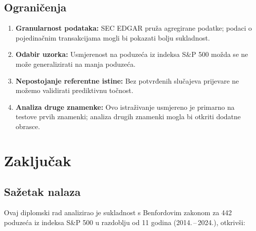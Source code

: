 \documentclass[12pt,a4paper]{article}
\begin{document}
\subsection{Ograničenja}

\begin{enumerate}
    \item \textbf{Granularnost podataka:} SEC EDGAR pruža agregirane podatke; podaci o pojedinačnim transakcijama mogli bi pokazati bolju sukladnost.

    \item \textbf{Odabir uzorka:} Usmjerenost na poduzeća iz indeksa S\&P 500 možda se ne može generalizirati na manja poduzeća.

    \item \textbf{Nepostojanje referentne istine:} Bez potvrđenih slučajeva prijevare ne možemo validirati prediktivnu točnost.

    \item \textbf{Analiza druge znamenke:} Ovo istraživanje usmjereno je primarno na testove prvih znamenki; analiza drugih znamenki mogla bi otkriti dodatne obrasce.
\end{enumerate}

\newpage
\section{Zaključak}

\subsection{Sažetak nalaza}

Ovaj diplomski rad analizirao je sukladnost s Benfordovim zakonom za 442 poduzeća iz indeksa S\&P 500 u razdoblju od 11 godina (2014.\,--\,2024.), otkrivši:
\end{document}
